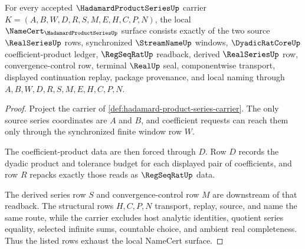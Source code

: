 \begin{theorem}
\label{thm:hadamard-product-series-namecert-obligations}
For every accepted $\HadamardProductSeriesUp$ carrier
$K=(A,B,W,D,R,S,M,E,H,C,P,N)$, the local
$\NameCert_{\HadamardProductSeriesUp}$ surface consists exactly of the two
source $\RealSeriesUp$ rows, synchronized $\StreamNameUp$ windows,
$\DyadicRatCoreUp$ coefficient-product ledger, $\RegSeqRatUp$ readback,
derived $\RealSeriesUp$ row, convergence-control row, terminal $\RealUp$
seal, componentwise transport, displayed continuation replay, package
provenance, and local naming through $A,B,W,D,R,S,M,E,H,C,P,N$.
\end{theorem}
\begin{proof}
Project the carrier of \autoref{def:hadamard-product-series-carrier}. The
only source series coordinates are $A$ and $B$, and coefficient requests can
reach them only through the synchronized finite window row $W$.

The coefficient-product data are then forced through $D$. Row $D$ records the
dyadic product and tolerance budget for each displayed pair of coefficients,
and row $R$ repacks exactly those reads as $\RegSeqRatUp$ data.

The derived series row $S$ and convergence-control row $M$ are downstream of
that readback. The structural rows $H,C,P,N$ transport, replay, source, and
name the same route, while the carrier excludes host analytic identities,
quotient series equality, selected infinite sums, countable choice, and
ambient real completeness. Thus the listed rows exhaust the local NameCert
surface.
\end{proof}

